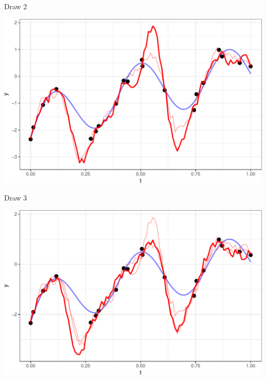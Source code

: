\documentclass[11pt,ignorenonframetext,]{beamer}
\begin{document}
\begin{frame}{%
\protect\hypertarget{draw-2}{%
Draw 2}}

\begin{center}\includegraphics[width=\textwidth]{Lec12_files/figure-beamer/unnamed-chunk-6-1} \end{center}

\end{frame}

\begin{frame}{%
\protect\hypertarget{draw-3}{%
Draw 3}}

\begin{center}\includegraphics[width=\textwidth]{Lec12_files/figure-beamer/unnamed-chunk-7-1} \end{center}

\end{frame}
\end{document}
